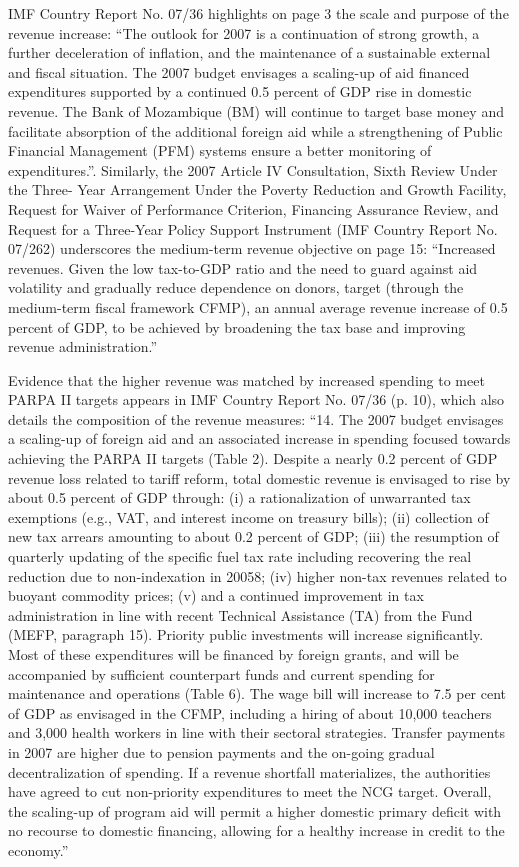 IMF Country Report No. 07/36 highlights on page 3 the scale and purpose of the revenue increase: “The outlook for 2007 is a continuation of strong growth, a further deceleration of inflation, and the maintenance of a sustainable external and fiscal situation. The 2007 budget envisages a scaling-up of aid financed expenditures supported by a continued 0.5 percent of GDP rise in domestic revenue. The Bank of Mozambique (BM) will continue to target base money and facilitate absorption of the additional foreign aid while a strengthening of Public Financial Management (PFM) systems ensure a better monitoring of expenditures.”. Similarly, the 2007 Article IV Consultation, Sixth Review Under the Three- Year Arrangement Under the Poverty Reduction and Growth Facility, Request for Waiver of Performance Criterion, Financing Assurance Review, and Request for a Three-Year Policy Support Instrument (IMF Country Report No. 07/262) underscores the medium-term revenue objective on page 15: “Increased revenues. Given the low tax-to-GDP ratio and the need to guard against aid volatility and gradually reduce dependence on donors, target (through the medium-term fiscal framework CFMP), an annual average revenue increase of 0.5 percent of GDP, to be achieved by broadening the tax base and improving revenue administration.”

Evidence that the higher revenue was matched by increased spending to meet PARPA II targets appears in IMF Country Report No. 07/36 (p. 10), which also details the composition of the revenue measures: “14. The 2007 budget envisages a scaling-up of foreign aid and an associated increase in spending focused towards achieving the PARPA II targets (Table 2). Despite a nearly 0.2 percent of GDP revenue loss related to tariff reform, total domestic revenue is envisaged to rise by about 0.5 percent of GDP through: (i) a rationalization of unwarranted tax exemptions (e.g., VAT, and interest income on treasury bills); (ii) collection of new tax arrears amounting to about 0.2 percent of GDP; (iii) the resumption of quarterly updating of the specific fuel tax rate including recovering the real reduction due to non-indexation in 20058; (iv) higher non-tax revenues related to buoyant commodity prices; (v) and a continued improvement in tax administration in line with recent Technical Assistance (TA) from the Fund (MEFP, paragraph 15). Priority public investments will increase significantly. Most of these expenditures will be financed by foreign grants, and will be accompanied by sufficient counterpart funds and current spending for maintenance and operations (Table 6). The wage bill will increase to 7.5 per cent of GDP as envisaged in the CFMP, including a hiring of about 10,000 teachers and 3,000 health workers in line with their sectoral strategies. Transfer payments in 2007 are higher due to pension payments and the on-going gradual decentralization of spending. If a revenue shortfall materializes, the authorities have agreed to cut non-priority expenditures to meet the NCG target. Overall, the scaling-up of program aid will permit a higher domestic primary deficit with no recourse to domestic financing, allowing for a healthy increase in credit to the economy.”

